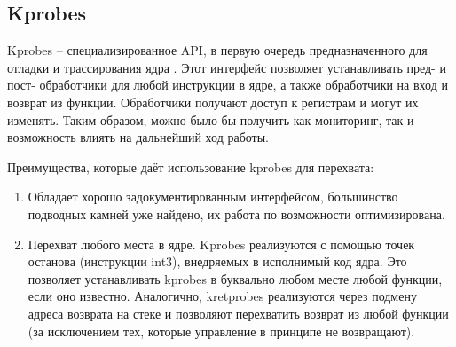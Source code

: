 	\subsection{Kprobes}
		Kprobes -- специализированное API, в первую очередь предназначенного для отладки и трассирования ядра \cite{kprobes}.
		Этот интерфейс позволяет устанавливать пред- и пост- обработчики для любой инструкции в ядре,
		а также обработчики на вход и возврат из функции. 
		Обработчики получают доступ к регистрам и могут их изменять. 
		Таким образом, можно было бы получить как мониторинг, так и возможность влиять на дальнейший ход работы.

		Преимущества, которые даёт использование kprobes для перехвата:
		\begin{enumerate}
			\item Обладает хорошо задокументированным интерфейсом, 
				большинство подводных камней уже найдено,
				их работа по возможности оптимизирована.
			\item Перехват любого места в ядре. 
				Kprobes реализуются с помощью точек останова (инструкции int3), 
				внедряемых в исполнимый код ядра. 
				Это позволяет устанавливать kprobes в буквально любом месте любой функции, если оно известно.
				Аналогично, kretprobes реализуются через подмену адреса возврата на стеке и позволяют перехватить
				возврат из любой функции (за исключением тех, которые управление в принципе не возвращают).
		\end{enumerate}
		
